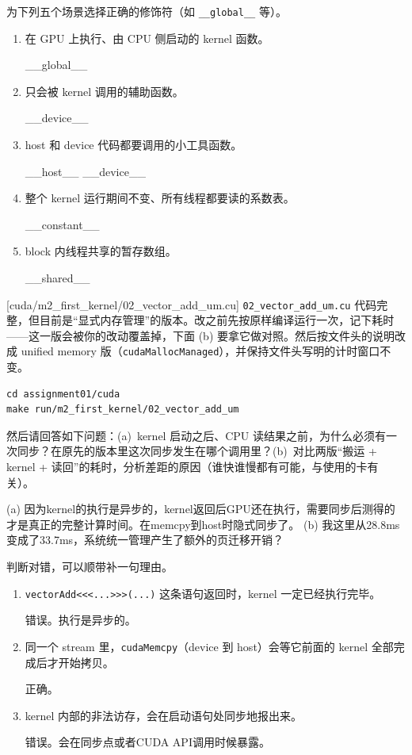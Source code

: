 \documentclass[11pt,a4paper,fontset=none]{ctexart}
\begin{document}
为下列五个场景选择正确的修饰符（如 \texttt{\_\_global\_\_} 等）。
\begin{enumerate}[label=(\alph*)]
  \item 在 GPU 上执行、由 CPU 侧启动的 kernel 函数。

  \_\_global\_\_
  \item 只会被 kernel 调用的辅助函数。

  \_\_device\_\_
  \item host 和 device 代码都要调用的小工具函数。

  \_\_host\_\_ \_\_device\_\_
  \item 整个 kernel 运行期间不变、所有线程都要读的系数表。

  \_\_constant\_\_
  \item block 内线程共享的暂存数组。

  \_\_shared\_\_
\end{enumerate}

[cuda/m2\_first\_kernel/02\_vector\_add\_um.cu]
\texttt{02\_vector\_add\_um.cu} 代码完整，但目前是“显式内存管理”的版本。改之前先按原样编译运行一次，记下耗时——这一版会被你的改动覆盖掉，下面 (b) 要拿它做对照。然后按文件头的说明改成 unified memory 版（\texttt{cudaMallocManaged}），并保持文件头写明的计时窗口不变。

\begin{lstlisting}
cd assignment01/cuda
make run/m2_first_kernel/02_vector_add_um
\end{lstlisting}

然后请回答如下问题：(a)~kernel 启动之后、CPU 读结果之前，为什么必须有一次同步？在原先的版本里这次同步发生在哪个调用里？(b)~对比两版“搬运 + kernel + 读回”的耗时，分析差距的原因（谁快谁慢都有可能，与使用的卡有关）。

(a) 因为kernel的执行是异步的，kernel返回后GPU还在执行，需要同步后测得的才是真正的完整计算时间。在memcpy到host时隐式同步了。
(b) 我这里从28.8ms变成了33.7ms，系统统一管理产生了额外的页迁移开销？

判断对错，可以顺带补一句理由。
\begin{enumerate}[label=(\alph*)]
  \item \texttt{vectorAdd<<<...>>>(...)} 这条语句返回时，kernel 一定已经执行完毕。

  错误。执行是异步的。

  \item 同一个 stream 里，\texttt{cudaMemcpy}（device 到 host）会等它前面的 kernel 全部完成后才开始拷贝。

  正确。

  \item kernel 内部的非法访存，会在启动语句处同步地报出来。

  错误。会在同步点或者CUDA API调用时候暴露。

\end{enumerate}
\end{document}
